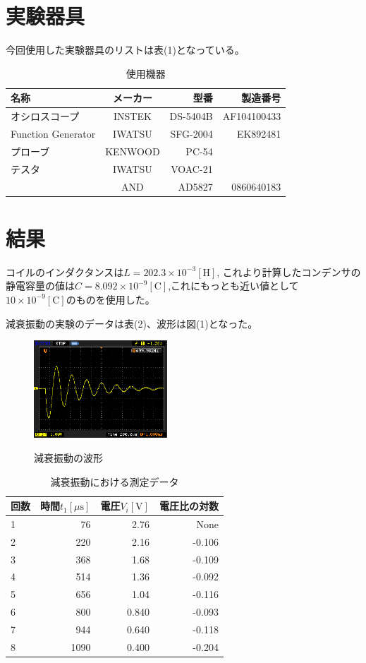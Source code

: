 \documentclass[a4j,10pt]{jarticle}
\begin{document}
\section{実験器具}
今回使用した実験器具のリストは表(1)となっている。
\begin{table}[hc]
\caption{使用機器}
\begin{tabular}{|l|c|r|r|}
\hline
名称 & メーカー & 型番 & 製造番号 \\ \hline \hline
オシロスコープ & INSTEK & DS-5404B & AF104100433 \\ \hline
Function Generator & IWATSU & SFG-2004 & EK892481 \\ \hline
プローブ&KENWOOD&PC-54&  \\ \hline
テスタ&IWATSU&VOAC-21& \\ \cline{2-4}
&AND&AD5827&0860640183 \\ \hline
\end{tabular}
\end{table}
\section{結果}
コイルのインダクタンスは$L=202.3\times10^{-3}[\mathrm H]$,
これより計算したコンデンサの静電容量の値は$C=8.092\times10^{-9}[\mathrm C]$,これにもっとも近い値として
$10\times10^{-9}[\mathrm C]$のものを使用した。

減衰振動の実験のデータは表(2)、波形は図(1)となった。
\begin{figure}[h]
\begin{center}
\label{Gensui}
\includegraphics[width=5cm]{freq.eps}
\caption{減衰振動の波形}
\end{center}
\end{figure}
\begin{table}[h]
\begin{center}
\caption{減衰振動における測定データ}
\begin{tabular}{|l|r|r|r|}
\hline
回数 & 時間$t_{1}[\mu \mathrm s]$ & 電圧$V_{i}[\mathrm V]$ & 電圧比の対数 \\ \hline \hline
1 & 76 & 2.76 & None \\ \hline
2 & 220 & 2.16 & -0.106 \\ \hline
3 & 368 & 1.68 & -0.109 \\ \hline
4 & 514 & 1.36 & -0.092 \\ \hline
5 & 656 & 1.04 & -0.116 \\ \hline
6 & 800 & 0.840 & -0.093 \\ \hline
7 & 944 & 0.640 & -0.118 \\ \hline
8 & 1090 & 0.400 & -0.204 \\ \hline
\end{tabular}
\end{center}
\end{table}
\end{document}
